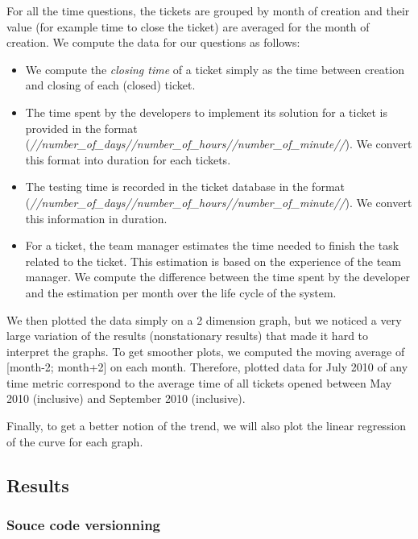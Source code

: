 \documentclass[10pt,conference]{IEEEtran}
\begin{document}
For all the time questions, the tickets are grouped by month of creation and their value (for example time to close the ticket) are averaged for the month of creation.  
We compute the data for our questions as follows:
\begin{itemize}
  
  \item We compute the \emph{closing time} of a ticket simply as the time between creation and closing of each (closed) ticket.

  \item  The time spent by the developers to implement its solution for a ticket is provided in the format (\emph{//number\_of\_days//number\_of\_hours//number\_of\_minute//}).
 We convert this format into duration for each tickets. 

 \item The testing time is recorded in the ticket database in the format (\emph{//number\_of\_days//number\_of\_hours//number\_of\_minute//}).
  We convert this information in duration.

 \item For a ticket, the team manager estimates the time needed to finish the task related to the ticket.
 This estimation is based on the experience of the team manager.  
 We compute the difference  between the time spent by the developer and the estimation per month over the life cycle of the system.  
\end{itemize}

We then plotted the data simply on a 2 dimension graph, but we noticed a very large variation of the results (nonstationary results) that made it hard to interpret the graphs.
To get smoother plots, we computed the moving average of [month-2; month+2] on each month.
Therefore, plotted data for July 2010 of any time metric correspond to the average time of all tickets opened between May 2010 (inclusive) and September 2010 (inclusive).

Finally, to get a better notion of the trend, we will also plot the linear regression of the curve for each graph.

\subsection{Results}

\subsubsection{Souce code versionning}
\end{document}
